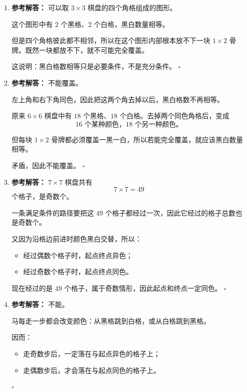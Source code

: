 \documentclass[11pt,a4paper,fontset=fandol]{ctexart}
\newenvironment{solution}{\par\noindent\textbf{参考解答：}}{\hfill$\square$\par}
\begin{document}
\begin{enumerate}
  \item \begin{solution}
  可以取 $3\times 3$ 棋盘的四个角格组成的图形。

  这个图形中有 $2$ 个黑格、$2$ 个白格，黑白数量相等。

  但是四个角格彼此都不相邻，所以在这个图形内部根本放不下一块 $1\times 2$ 骨牌。既然一块都放不下，就不可能完全覆盖。

  这说明：黑白格数相等只是必要条件，不是充分条件。
  \end{solution}

  \item \begin{solution}
  不能覆盖。

  左上角和右下角同色，因此把这两个角去掉以后，黑白格数不再相等。

  原来 $6\times 6$ 棋盘中有 $18$ 个黑格、$18$ 个白格。去掉两个同色角格后，变成
  \[
  16\text{ 个某种颜色，}18\text{ 个另一种颜色。}
  \]

  但每块 $1\times 2$ 骨牌都必须覆盖一黑一白，所以若能完全覆盖，就应该黑白数量相等。

  矛盾，因此不能覆盖。
  \end{solution}

  \item \begin{solution}
  $7\times 7$ 棋盘共有
  \[
  7\times 7=49
  \]
  个格子，是奇数个。

  一条满足条件的路径要把这 $49$ 个格子都经过一次，因此它经过的格子总数也是奇数个。

  又因为沿格边前进时颜色黑白交替，所以：
  \begin{itemize}
    \item 经过偶数个格子时，起点终点异色；
    \item 经过奇数个格子时，起点终点同色。
  \end{itemize}

  现在经过的是 $49$ 个格子，属于奇数情形，因此起点和终点一定同色。
  \end{solution}

  \item \begin{solution}
  不能。

  马每走一步都会改变颜色：从黑格跳到白格，或从白格跳到黑格。

  因而：
  \begin{itemize}
    \item 走奇数步后，一定落在与起点异色的格子上；
    \item 走偶数步后，才会落在与起点同色的格子上。
  \end{itemize}


\end{solution}
\end{enumerate}
\end{document}
